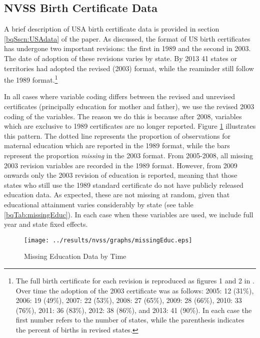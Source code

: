 \documentclass[a4paper, 11 pt]{article}
\theoremstyle{plain}
\begin{document}
\begin{spacing}{1.4}
\subsection{NVSS Birth Certificate Data}
A brief description of USA birth certificate data is provided in section 
\ref{bqSscn:USAdata} of the paper.  As discussed, the format of US birth
certificates has undergone two important revisions: the first in 1989
and the second in 2003.  The date of adoption of these revisions varies 
by state.  By 2013 41 states or territories had adopted the revised (2003)
format, while the reaminder still follow the 1989 format.\footnote{The full
birth certificate for each revision is reproduced as figures 1 and 2 in
\citet{MenackerMartin2005}.  Over time the adoption of the 2003 certificate 
was as follows: 2005: 12 (31\%), 2006: 19 (49\%), 2007: 22 (53\%), 2008: 27 
(65\%), 2009: 28 (66\%), 2010: 33 (76\%), 2011: 36 (83\%), 2012: 38 (86\%),
and 2013: 41 (90\%).  In each case the first number refers to the number
of states, while the parenthesis indicates the percent of births in revised
states.}

In all cases where variable coding differs between the revised and unrevised
certificates (principally education for mother and father), we use the revised
2003 coding of the variables.  The reason we do this is because after 2008,
variables which are exclusive to 1989 certificates are no longer reported.
Figure \ref{bqFig:educMissing} illustrates this pattern.  The dotted line 
represents the proportion of observations for maternal education which are
reported in the 1989 format, while the bars represent the proportion 
\emph{missing} in the 2003 format.  From 2005-2008, all missing 2003 revision
variables are recorded in the 1989 format.  However, from 2009 onwards only
the 2003 revision of education is reported, meaning that those states who
still use the 1989 standard certificate do not have publicly released education
data.  As expected, these are not missing at random, given that educational
attainment varies considerably by state (see table \ref{bqTab:missingEduc}).
In each case when these variables are used, we include full year and state
fixed effects.  
\begin{figure}[htpb!]
\caption{Missing Education Data by Time}
\label{bqFig:educMissing}
\texttt{[image: ../results/nvss/graphs/missingEduc.eps]}
\end{figure}



\end{spacing}
\end{document}
